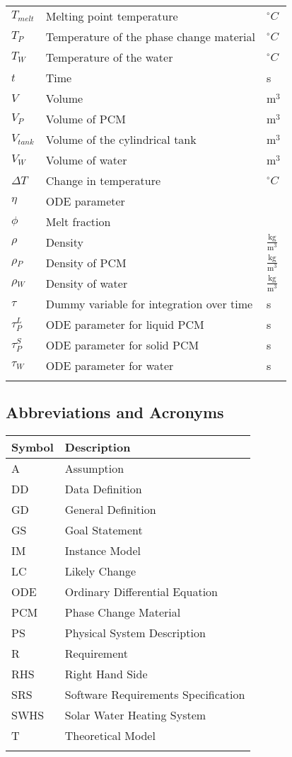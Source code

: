 \documentclass[12pt]{article}
\begin{document}
\begin{longtable*}{l l l}
$T_{melt}$ & Melting point temperature & ${}^{\circ}C$
\\
$T_{P}$ & Temperature of the phase change material & ${}^{\circ}C$
\\
$T_{W}$ & Temperature of the water & ${}^{\circ}C$
\\
$t$ & Time & s
\\
$V$ & Volume & $\text{m}^{3}$
\\
$V_{P}$ & Volume of PCM & $\text{m}^{3}$
\\
$V_{tank}$ & Volume of the cylindrical tank & $\text{m}^{3}$
\\
$V_{W}$ & Volume of water & $\text{m}^{3}$
\\
$\Delta{}T$ & Change in temperature & ${}^{\circ}C$
\\
$\eta{}$ & ODE parameter & 
\\
$\phi{}$ & Melt fraction & 
\\
$\rho{}$ & Density & $\frac{\text{kg}}{\text{m}^{3}}$
\\
$\rho{}_{P}$ & Density of PCM & $\frac{\text{kg}}{\text{m}^{3}}$
\\
$\rho{}_{W}$ & Density of water & $\frac{\text{kg}}{\text{m}^{3}}$
\\
$\tau{}$ & Dummy variable for integration over time & s
\\
$\tau{}_{P}^{L}$ & ODE parameter for liquid PCM & s
\\
$\tau{}_{P}^{S}$ & ODE parameter for solid PCM & s
\\
$\tau{}_{W}$ & ODE parameter for water & s
\\
\bottomrule
\label{Table:ToS}
\end{longtable*}
\subsection{Abbreviations and Acronyms}
\label{Sec:AaA}
\begin{longtable*}{l l}
\toprule
Symbol & Description
\\
\midrule
A & Assumption
\\
DD & Data Definition
\\
GD & General Definition
\\
GS & Goal Statement
\\
IM & Instance Model
\\
LC & Likely Change
\\
ODE & Ordinary Differential Equation
\\
PCM & Phase Change Material
\\
PS & Physical System Description
\\
R & Requirement
\\
RHS & Right Hand Side
\\
SRS & Software Requirements Specification
\\
SWHS & Solar Water Heating System
\\
T & Theoretical Model
\\
\bottomrule
\label{Table:AaA}
\end{longtable*}
\end{document}
